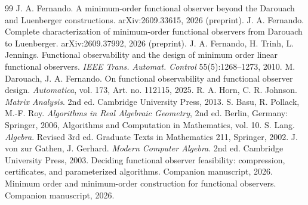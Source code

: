 \documentclass[journal]{IEEEtran}
\theoremstyle{plainn}
\theoremstyle{remark}
\begin{document}
\begin{thebibliography}{99}
 J. A. Fernando. A minimum-order functional observer beyond the Darouach and Luenberger constructions. arXiv:2609.33615, 2026 (preprint).
 J. A. Fernando. Complete characterization of minimum-order functional observers from Darouach to Luenberger. arXiv:2609.37992, 2026 (preprint).
 J. A. Fernando, H. Trinh, L. Jennings. Functional observability and the design of minimum order linear functional observers. \emph{IEEE Trans. Automat. Control} 55(5):1268--1273, 2010.
 M. Darouach, J. A. Fernando. On functional observability and functional observer design. \emph{Automatica}, vol. 173, Art. no. 112115, 2025.
 R. A. Horn, C. R. Johnson. \emph{Matrix Analysis}. 2nd ed. Cambridge University Press, 2013.
 S. Basu, R. Pollack, M.-F. Roy. \emph{Algorithms in Real Algebraic Geometry}, 2nd ed. Berlin, Germany: Springer, 2006, Algorithms and Computation in Mathematics, vol. 10.
 S. Lang. \emph{Algebra}. Revised 3rd ed. Graduate Texts in Mathematics 211, Springer, 2002.
 J. von zur Gathen, J. Gerhard. \emph{Modern Computer Algebra}. 2nd ed. Cambridge University Press, 2003.
 Deciding functional observer feasibility: compression, certificates, and parameterized algorithms. Companion manuscript, 2026.
 Minimum order and minimum-order construction for functional observers. Companion manuscript, 2026.
\end{thebibliography}
\end{document}
